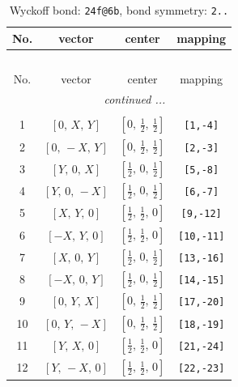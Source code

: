 \documentclass[fleqn,8pt]{jsarticle}
\begin{document}
\renewcommand{\arraystretch}{1.2}
\begin{longtable}{cccc}
\caption{Wyckoff bond: {\tt 24f@6b}, bond symmetry: {\tt 2..}}
 \\
 \hline \hline
No. & vector & center & mapping \\ \hline \endfirsthead

\multicolumn{3}{l}{\tablename\ \thetable{}} \\
 \hline \hline
No. & vector & center & mapping \\ \hline \endhead

 \hline \hline
\multicolumn{3}{r}{\footnotesize\it continued ...} \\ \endfoot

 \hline \hline
\multicolumn{3}{r}{} \\ \endlastfoot

1 & $\left[ 0,\, X,\, Y \right]$ & $\left[ 0,\, \frac{1}{2},\, \frac{1}{2} \right]$ & {\tt [1,-4]} \\ \hline
2 & $\left[ 0,\, - X,\, Y \right]$ & $\left[ 0,\, \frac{1}{2},\, \frac{1}{2} \right]$ & {\tt [2,-3]} \\ \hline
3 & $\left[ Y,\, 0,\, X \right]$ & $\left[ \frac{1}{2},\, 0,\, \frac{1}{2} \right]$ & {\tt [5,-8]} \\ \hline
4 & $\left[ Y,\, 0,\, - X \right]$ & $\left[ \frac{1}{2},\, 0,\, \frac{1}{2} \right]$ & {\tt [6,-7]} \\ \hline
5 & $\left[ X,\, Y,\, 0 \right]$ & $\left[ \frac{1}{2},\, \frac{1}{2},\, 0 \right]$ & {\tt [9,-12]} \\ \hline
6 & $\left[ - X,\, Y,\, 0 \right]$ & $\left[ \frac{1}{2},\, \frac{1}{2},\, 0 \right]$ & {\tt [10,-11]} \\ \hline
7 & $\left[ X,\, 0,\, Y \right]$ & $\left[ \frac{1}{2},\, 0,\, \frac{1}{2} \right]$ & {\tt [13,-16]} \\ \hline
8 & $\left[ - X,\, 0,\, Y \right]$ & $\left[ \frac{1}{2},\, 0,\, \frac{1}{2} \right]$ & {\tt [14,-15]} \\ \hline
9 & $\left[ 0,\, Y,\, X \right]$ & $\left[ 0,\, \frac{1}{2},\, \frac{1}{2} \right]$ & {\tt [17,-20]} \\ \hline
10 & $\left[ 0,\, Y,\, - X \right]$ & $\left[ 0,\, \frac{1}{2},\, \frac{1}{2} \right]$ & {\tt [18,-19]} \\ \hline
11 & $\left[ Y,\, X,\, 0 \right]$ & $\left[ \frac{1}{2},\, \frac{1}{2},\, 0 \right]$ & {\tt [21,-24]} \\ \hline
12 & $\left[ Y,\, - X,\, 0 \right]$ & $\left[ \frac{1}{2},\, \frac{1}{2},\, 0 \right]$ & {\tt [22,-23]} \\
\end{longtable}
\end{document}

